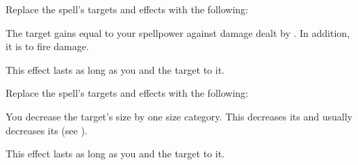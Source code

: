 Replace the spell's targets and effects with the following:
\begin{spellcontent}

\begin{augmenttargetinginfo}



\end{augmenttargetinginfo}


\begin{augmenteffects}



\spelleffect
The target gains  equal to your spellpower against damage dealt by .
In addition, it is  to fire damage.

This effect lasts as long as you and the target  to it.






\end{augmenteffects}

\end{spellcontent}








Replace the spell's targets and effects with the following:
\begin{spellcontent}

\begin{augmenttargetinginfo}



\end{augmenttargetinginfo}


\begin{augmenteffects}



\spelleffect
You decrease the target's size by one size category.
This decreases its  and usually decreases its  (see ).

This effect lasts as long as you and the target  to it.








\end{augmenteffects}

\end{spellcontent}






